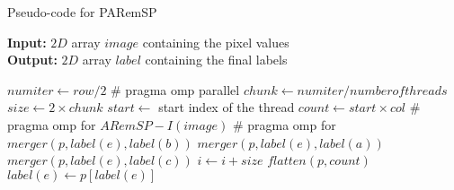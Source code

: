 \begin{algorithm}[H]
\small
{
	\caption{Pseudo-code for PARemSP}
	\label{alg:PARemSP}
	\textbf{Input:} $2D$ array $image$ containing the pixel values \\
	\textbf{Output:} $2D$ array $label$ containing the final labels
	\begin{algorithmic}[1]
		\State $num iter \gets row/2 $ 
		\State \# pragma omp parallel
			\State $chunk \gets numiter/number of threads $ 
			\State $size \gets 2 \times chunk$
			\State $start \gets $ start index of the thread
			\State $count \gets start \times col$
			\State \# pragma omp for
				\State $ARemSP-I(image)$
			\State \# pragma omp for
					  			\State $merger(p,label(e),label(b))$
					  		\Else
									\State $merger(p,label(e),label(a))$
								\EndIf
									\State $merger(p,label(e),label(c))$
								\EndIf
							\EndIf
						\EndIf
					\EndFor
					\State $i \gets i + size$
				\EndFor		
		\State $flatten(p,count)$ 
				\State $label(e) \gets p[label(e)]$
			\EndFor
		\EndFor		
	\EndFunction
	\end{algorithmic}	
}
\end{algorithm}

